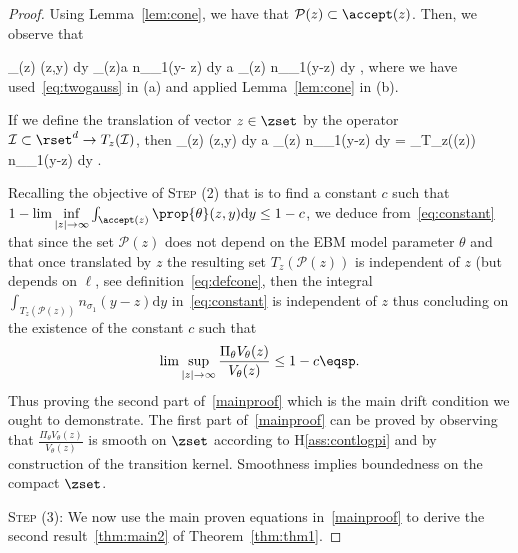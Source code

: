 \documentclass[letterpaper]{article} %
\begin{document}
\begin{proof}
Using Lemma~\ref{lem:cone}, we have that $\mathcal{P}(z) \subset \accept(z)$.
Then, we observe that  

\beq 
 \int_{\accept(z)} \prop{\theta}(z,y)  \textrm{d}y   \int_{\accept(z)}a n_{\sigma_1}(y- z)  \textrm{d}y  a \int_{(z)}  n_{\sigma_1}(y-z)  \textrm{d}y \eqsp,
 \eeq
where we have used~\eqref{eq:twogauss} in (a) and applied Lemma~\ref{lem:cone} in (b).

If we define the translation of vector $z \in \zset$ by the operator $\mathcal{I} \subset \rset^d \to T_z(\mathcal{I})$, then
\beq\label{eq:constant}
 \int_{\accept(z)} \prop{\theta}(z,y)  \textrm{d}y \geq a \int_{(z)}  n_{\sigma_1}(y-z)  \textrm{d}y =  \int_{T_z((z))}  n_{\sigma_1}(y-z)  \textrm{d}y \eqsp.
\eeq


Recalling the objective of \noindent \textsc{Step (2)} that is to find a constant $c$ such that $1 - \lim \inf \limits_{|z| \to \infty}  \int_{\accept(z)} \prop{\theta}(z,y)  \textrm{d}y \leq 1 - c$, we deduce from~\eqref{eq:constant} that since the set $\mathcal{P}(z)$ does not depend on the EBM model parameter $\theta$ and that once translated by $z$ the resulting set $T_z(\mathcal{P}(z))$ is independent of $z$ (but depends on $\ell$, see definition~\eqref{eq:defcone}, then the integral $ \int_{T_z(\mathcal{P}(z))}  n_{\sigma_1}(y-z)  \textrm{d}y$ in~\eqref{eq:constant} is independent of $z$ thus concluding on the existence of the constant $c$ such that 
$$\lim \sup \limits_{|z| \to \infty}  \frac{\Pi_\theta V_\theta(z)}{V_\theta(z)} \leq 1- c \eqsp.$$ 
Thus proving the second part of~\eqref{mainproof} which is the main drift condition we ought to demonstrate.
The first part of~\eqref{mainproof} can be proved by observing that $  \frac{\Pi_\theta V_\theta(z)}{V_\theta(z)} $ is smooth on $\zset$ according to H\ref{ass:contlogpi} and by construction of the transition kernel. Smoothness implies boundedness on the compact $\zset$.


\medskip
\noindent \textsc{Step (3): } 
We now use the main proven equations in~\eqref{mainproof} to derive the second result~\eqref{thm:main2} of Theorem~\ref{thm:thm1}.


\end{proof}
\end{document}
